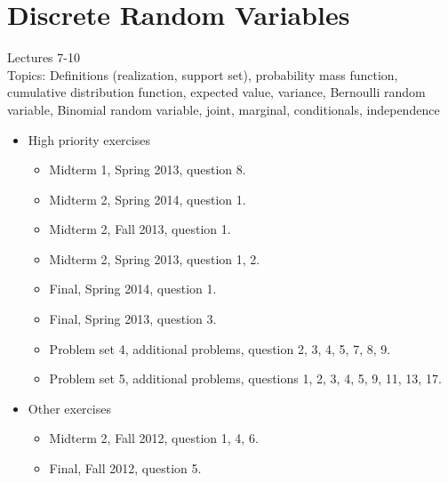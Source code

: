 \documentclass[11pt]{article}
\begin{document}
\section{Discrete Random Variables} 
Lectures 7-10\\[0.2in]
Topics: Definitions (realization, support set), probability mass function, cumulative distribution function, expected value, variance, Bernoulli random variable, Binomial random variable, joint, marginal, conditionals, independence
\begin{itemize}
	\item High priority exercises
	\begin{itemize}
		\item Midterm 1, Spring 2013, question 8.
		\item Midterm 2, Spring 2014, question 1.
		\item Midterm 2, Fall 2013, question 1.
		\item Midterm 2, Spring 2013, question 1, 2.
		\item Final, Spring 2014, question 1.
		\item Final, Spring 2013, question 3.
		\item Problem set 4, additional problems, question 2, 3, 4, 5, 7, 8, 9.
		\item Problem set 5, additional problems, questions 1, 2, 3, 4, 5, 9, 11, 13, 17.
	\end{itemize}
	\item Other exercises
	\begin{itemize}
		\item Midterm 2, Fall 2012, question 1, 4, 6.
		\item Final, Fall 2012, question 5.
	\end{itemize}
\end{itemize}
\end{document}
